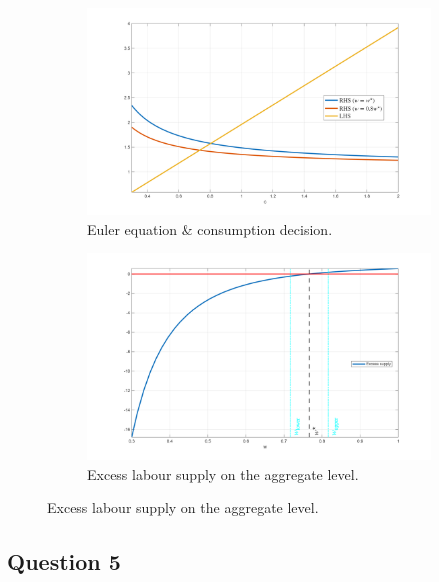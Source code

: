 \begin{figure}[hbt]
\centering
\caption{Household block of the model.}
\begin{subfigure}{.5\textwidth}
  \centering
  \caption{Euler equation \& consumption decision.}
  \includegraphics[width=\linewidth]{_figures/consumption_plot.png}
\end{subfigure}%
\begin{subfigure}{.5\textwidth}
  \centering
    \caption{Excess labour supply on the aggregate level.}
    \label{fig:a1_bisection}
  \includegraphics[width=\linewidth]{_figures/excess_supply_bisection.png}
\end{subfigure}
\end{figure}	

\subsection*{Question 5}


